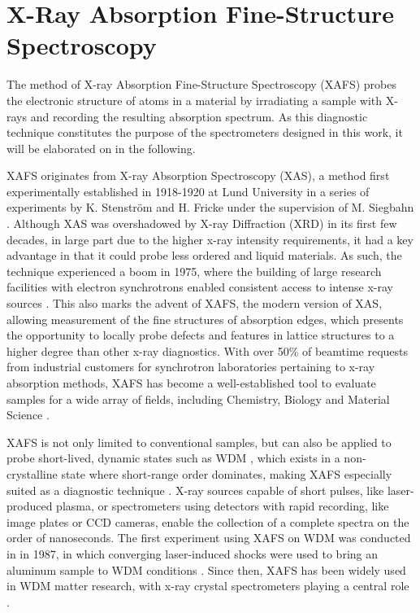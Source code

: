 \chapter{X-Ray Absorption Fine-Structure Spectroscopy}
\label{chapter: XAFS}

The method of X-ray Absorption Fine-Structure Spectroscopy (XAFS) probes the electronic structure of atoms in a material by 
irradiating a sample with X-rays and recording the resulting absorption spectrum. As this diagnostic technique constitutes the purpose of the spectrometers designed in this work, it will be elaborated on in the following.

XAFS originates from X-ray Absorption Spectroscopy (XAS), a method 
first experimentally established in 1918-1920 at Lund University in a series of experiments by K. Stenström and H. Fricke under the supervision of M. Siegbahn \citep{siegbahn1925spectroscopy, mottana2013}. Although XAS was 
overshadowed by X-ray Diffraction (XRD) in its first few decades, in large part due 
to the higher x-ray intensity requirements, it had a key advantage in that it 
could probe less ordered and liquid materials. As such, the technique 
experienced a boom in 1975, where the building of 
large research facilities with electron synchrotrons enabled consistent 
access 
to intense x-ray sources \citep{stumm1989history}. This also 
marks the advent of XAFS, the modern version of XAS, allowing measurement of 
the fine structures of absorption edges, which presents the opportunity to 
locally probe defects and features in lattice 
structures to a 
higher degree than other x-ray diagnostics. With 
over 50\% of beamtime requests from industrial customers for synchrotron 
laboratories pertaining to x-ray absorption methods, XAFS has become a 
well-established tool to evaluate samples for a wide array of fields, 
including 
Chemistry, Biology and Material Science 
\citep{mottana2015historical}.

XAFS is not only limited to conventional samples, but can also be applied to probe short-lived, dynamic states such as WDM \citep{eason1984improved}, which exists in a non-crystalline state where 
short-range order dominates, making XAFS especially suited as a diagnostic 
technique \citep{levy2009x}. X-ray sources 
capable of short pulses, like laser-produced plasma, or spectrometers using detectors 
with 
rapid recording, like image plates or CCD cameras, enable the collection of a complete spectra on the order of nanoseconds. The first experiment using XAFS on WDM was conducted in in 
1987, 
in which converging laser-induced shocks were used to bring an aluminum 
sample 
to WDM conditions \citep{hall1988experimental}. Since then, XAFS has been 
widely used in WDM matter research, with x-ray crystal spectrometers playing 
a 
central role \citep{riley2021warm, levy2009x, torchio2016probing}.

